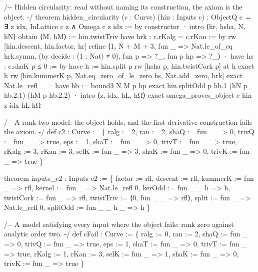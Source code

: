 \documentclass[10pt,twocolumn]{article}
\newenvironment{Shaded}{}{}
\newcommand{\NormalTok}[1]{#1}
\providecommand{\NormalTok}[1]{#1}
\providecommand{\NormalTok}[1]{#1}
\begin{document}
\begin{strip}
\begin{Shaded}
\begin{Highlighting}[]
\NormalTok{/{-}{-} Hidden circularity: read without naming its construction, the axiom is the object. {-}/}
\NormalTok{theorem hidden\_circularity (c : Curve) (hin : Inputs c) :}
\NormalTok{    ObjectQ c ↔ ∃ z idx, InLattice c z ∧ Omega c z idx := by}
\NormalTok{  constructor}
\NormalTok{  · intro ⟨hr, hsha, N, hN⟩}
\NormalTok{    obtain ⟨M, hM⟩ := hin.twistTriv}
\NormalTok{    have hrk : c.rKalg = c.rKan := by rw [hin.descent, hin.factor, hr]}
\NormalTok{    refine ⟨1, N + M + 3, fun \_ =\textgreater{} Nat.le\_of\_eq hrk.symm, (by decide : (1 : Nat) ≠ 0), fun p =\textgreater{} ?\_, fun p hp =\textgreater{} ?\_⟩}
\NormalTok{    · have hs : c.shaK p ≤ 0 := by}
\NormalTok{        have h := hin.split p}
\NormalTok{        rw [hsha p, hin.twistCork p] at h}
\NormalTok{        exact h}
\NormalTok{      rw [hin.kummerK p, Nat.eq\_zero\_of\_le\_zero hs, Nat.add\_zero, hrk]}
\NormalTok{      exact Nat.le\_refl \_}
\NormalTok{    · have hb := bound3 N M p hp}
\NormalTok{      exact hin.splitOdd p hb.1 (hN p hb.2.1) (hM p hb.2.2)}
\NormalTok{  · intro ⟨z, idx, hL, hΩ⟩}
\NormalTok{    exact omega\_proves\_object c hin z idx hL hΩ}

\NormalTok{/{-}{-} A rank{-}two model: the object holds, and the first{-}derivative construction fails the axiom. {-}/}
\NormalTok{def c2 : Curve :=}
\NormalTok{  \{ ralg := 2, ran := 2, shaQ := fun \_ =\textgreater{} 0, trivQ := fun \_ =\textgreater{} true, eps := 1,}
\NormalTok{    shaT := fun \_ =\textgreater{} 0, trivT := fun \_ =\textgreater{} true, rKalg := 3, rKan := 3,}
\NormalTok{    selK := fun \_ =\textgreater{} 3, shaK := fun \_ =\textgreater{} 0, trivK := fun \_ =\textgreater{} true \}}

\NormalTok{theorem inputs\_c2 : Inputs c2 :=}
\NormalTok{  \{ factor := rfl, descent := rfl, kummerK := fun \_ =\textgreater{} rfl, kernel := fun \_ =\textgreater{} Nat.le\_refl 0,}
\NormalTok{    kerOdd := fun \_ \_ h =\textgreater{} h, twistCork := fun \_ =\textgreater{} rfl, twistTriv := ⟨0, fun \_ \_ =\textgreater{} rfl⟩,}
\NormalTok{    split := fun \_ =\textgreater{} Nat.le\_refl 0, splitOdd := fun \_ \_ h \_ =\textgreater{} h \}}

\NormalTok{/{-}{-} A model satisfying every input where the object fails: rank zero against analytic order two. {-}/}
\NormalTok{def cFail : Curve :=}
\NormalTok{  \{ ralg := 0, ran := 2, shaQ := fun \_ =\textgreater{} 0, trivQ := fun \_ =\textgreater{} true, eps := 1,}
\NormalTok{    shaT := fun \_ =\textgreater{} 0, trivT := fun \_ =\textgreater{} true, rKalg := 1, rKan := 3,}
\NormalTok{    selK := fun \_ =\textgreater{} 1, shaK := fun \_ =\textgreater{} 0, trivK := fun \_ =\textgreater{} true \}}


\end{Highlighting}
\end{Shaded}
\end{strip}
\end{document}

